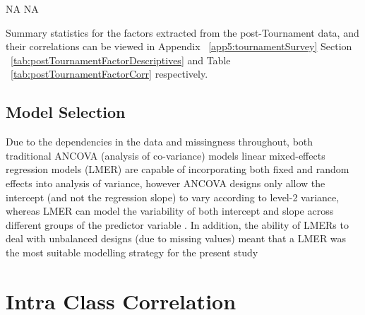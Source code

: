 {
NA
NA

Summary statistics for the factors extracted from the post-Tournament data, and their correlations can be viewed in Appendix ~\ref{app5:tournamentSurvey} Section
 ~\ref{tab:postTournamentFactorDescriptives} and Table ~\ref{tab:postTournamentFactorCorr} respectively.


















\subsection{\label{app5:modelSelection}Model Selection}
Due to the dependencies in the data and missingness throughout, both traditional ANCOVA (analysis of co-variance) models linear mixed-effects regression models (LMER) are capable of incorporating both fixed and random effects into analysis of variance, however ANCOVA designs only allow the intercept (and not the regression slope) to vary according to level-2 variance, whereas LMER can model the variability of both intercept and slope across different groups of the predictor variable \citep{Field2012}. In addition, the ability of LMERs to deal with unbalanced designs (due to missing values) meant that a LMER was the most suitable modelling strategy for the present study



\section{Intra Class Correlation}

}
